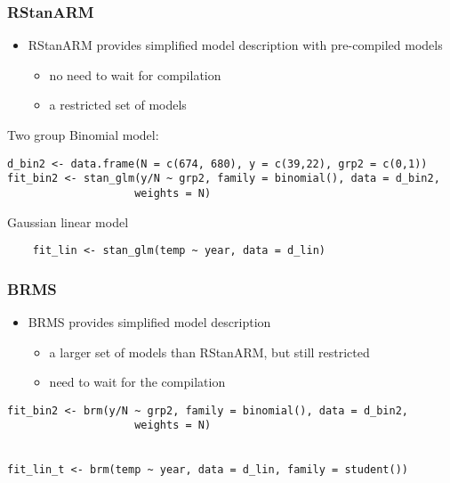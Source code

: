 \documentclass[finnish,english,t]{beamer}
\begin{document}
\begin{frame}[fragile]
  \frametitle{RStanARM}

  \begin{itemize}
  \item RStanARM provides simplified model description with
    pre-compiled models
    \begin{itemize}
    \item no need to wait for compilation
    \item a restricted set of models
    \end{itemize}
  \end{itemize}

Two group Binomial model:
  {\scriptsize
\begin{lstlisting}
d_bin2 <- data.frame(N = c(674, 680), y = c(39,22), grp2 = c(0,1))
fit_bin2 <- stan_glm(y/N ~ grp2, family = binomial(), data = d_bin2,
                    weights = N)
\end{lstlisting}
  }
    Gaussian linear model
  {\scriptsize
\begin{lstlisting}
    fit_lin <- stan_glm(temp ~ year, data = d_lin)
\end{lstlisting}
  }

    
\end{frame} 


\begin{frame}[fragile]
  \frametitle{BRMS}

  \begin{itemize}
  \item BRMS provides simplified model description
    \begin{itemize}
    \item a larger set of models than RStanARM, but still restricted
    \item need to wait for the compilation
    \end{itemize}
  \end{itemize}

  {\scriptsize
\begin{lstlisting}[]
fit_bin2 <- brm(y/N ~ grp2, family = binomial(), data = d_bin2,
                    weights = N)


fit_lin_t <- brm(temp ~ year, data = d_lin, family = student())
\end{lstlisting}
    }
    
\end{frame} 
\end{document}
